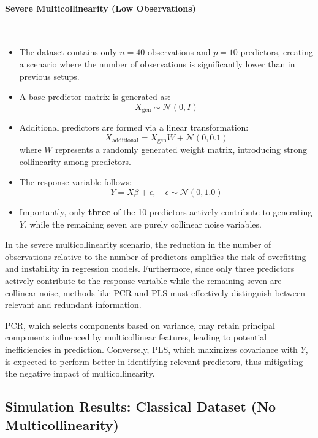 \documentclass[11pt,twoside,a4paper]{article}
\begin{document}
\paragraph{Severe Multicollinearity (Low Observations)} \ \

\begin{itemize}

    \item The dataset contains only \( n = 40 \) observations and \( p = 10 \) predictors, creating a scenario where the number of observations is significantly lower than in previous setups.
    \item A base predictor matrix is generated as:
    \[ X_{\text{gen}} \sim \mathcal{N}(0, I) \]
    \item Additional predictors are formed via a linear transformation:
    \[ X_{\text{additional}} = X_{\text{gen}} W + \mathcal{N}(0, 0.1) \]
    where \( W \) represents a randomly generated weight matrix, introducing strong collinearity among predictors.
    \item The response variable follows:
    \[ Y = X \beta + \epsilon, \quad \epsilon \sim \mathcal{N}(0, 1.0) \]
    \item Importantly, only \textbf{three} of the 10 predictors actively contribute to generating \( Y \), while the remaining seven are purely collinear noise variables.
    
\end{itemize}

In the severe multicollinearity scenario, the reduction in the number of observations relative to the number of predictors amplifies the risk of overfitting and instability in regression models. Furthermore, since only three predictors actively contribute to the response variable while the remaining seven are collinear noise, methods like PCR and PLS must effectively distinguish between relevant and redundant information. 

PCR, which selects components based on variance, may retain principal components influenced by multicollinear features, leading to potential inefficiencies in prediction. Conversely, PLS, which maximizes covariance with \( Y \), is expected to perform better in identifying relevant predictors, thus mitigating the negative impact of multicollinearity.

\subsection{Simulation Results: Classical Dataset (No Multicollinearity)}  
\end{document}
